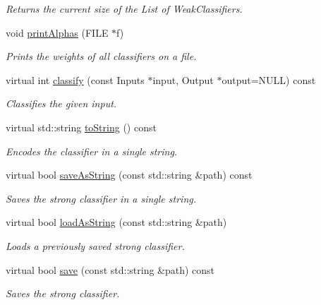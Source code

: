 \begin{DoxyCompactItemize}
\begin{DoxyCompactList}\small\item\em Returns the current size of the List of Weak\+Classifiers. \end{DoxyCompactList}\item 
void \hyperlink{classiCub_1_1boostMIL_1_1StrongClassifier_acdfb5551c7b9315ab4077566809064fc}{print\+Alphas} (F\+I\+L\+E $\ast$f)
\begin{DoxyCompactList}\small\item\em Prints the weights of all classifiers on a file. \end{DoxyCompactList}\item 
virtual int \hyperlink{classiCub_1_1boostMIL_1_1StrongClassifier_a1fee2d421c908292846b6e7356c7c6d1}{classify} (const Inputs $\ast$input, Output $\ast$output=N\+U\+L\+L) const 
\begin{DoxyCompactList}\small\item\em Classifies the given input. \end{DoxyCompactList}\item 
virtual std\+::string \hyperlink{classiCub_1_1boostMIL_1_1StrongClassifier_adb838aab38a5503330b4335c2b4d7a0f}{to\+String} () const 
\begin{DoxyCompactList}\small\item\em Encodes the classifier in a single string. \end{DoxyCompactList}\item 
virtual bool \hyperlink{classiCub_1_1boostMIL_1_1StrongClassifier_ab92075af6f373b770f723e1289fca780}{save\+As\+String} (const std\+::string \&path) const 
\begin{DoxyCompactList}\small\item\em Saves the strong classifier in a single string. \end{DoxyCompactList}\item 
virtual bool \hyperlink{classiCub_1_1boostMIL_1_1StrongClassifier_aa3dafb8b823e28e200ce97ec81676667}{load\+As\+String} (const std\+::string \&path)
\begin{DoxyCompactList}\small\item\em Loads a previously saved strong classifier. \end{DoxyCompactList}\item 
virtual bool \hyperlink{classiCub_1_1boostMIL_1_1StrongClassifier_ac812325b217d16e1e3c469e5d4a9eb76}{save} (const std\+::string \&path) const 
\begin{DoxyCompactList}\small\item\em Saves the strong classifier. \end{DoxyCompactList}\item 

\end{DoxyCompactItemize}
